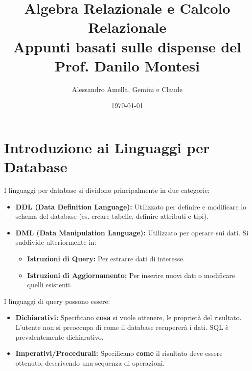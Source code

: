 

\usepackage{hyperref}

\title{Algebra Relazionale e Calcolo Relazionale\\
  \large Appunti basati sulle dispense del Prof. Danilo Montesi}
\author{Alessandro Amella, Gemini e Claude}
\date{\today}


	
	\maketitle
	\tableofcontents
	\newpage
	
	\section{Introduzione ai Linguaggi per Database}
	
	I linguaggi per database si dividono principalmente in due categorie:
	\begin{itemize}
		\item \textbf{DDL (Data Definition Language):} Utilizzato per definire e modificare lo schema del database (es. creare tabelle, definire attributi e tipi).
		\item \textbf{DML (Data Manipulation Language):} Utilizzato per operare sui dati. Si suddivide ulteriormente in:
		\begin{itemize}
			\item \textbf{Istruzioni di Query:} Per estrarre dati di interesse.
			\item \textbf{Istruzioni di Aggiornamento:} Per inserire nuovi dati o modificare quelli esistenti.
		\end{itemize}
	\end{itemize}
	
	I linguaggi di query possono essere:
	\begin{itemize}
		\item \textbf{Dichiarativi:} Specificano \textbf{cosa} si vuole ottenere, le proprietà del risultato. L'utente non si preoccupa di come il database recupererà i dati. SQL è prevalentemente dichiarativo.
		\item \textbf{Imperativi/Procedurali:} Specificano \textbf{come} il risultato deve essere ottenuto, descrivendo una sequenza di operazioni.
	\end{itemize}
	
